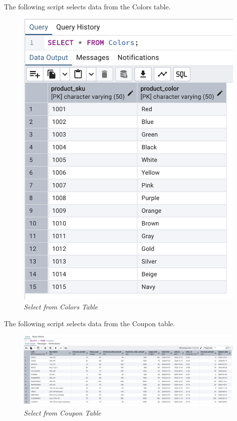 The following script selects data from the Colors table.


\begin{figure}[H]
  \centering
  \includegraphics[width=1\textwidth]{images/sql/select/colors.png}
  \caption{\textit{Select from Colors Table}}
\end{figure}

The following script selects data from the Coupon table.


\begin{figure}[H]
  \centering
  \includegraphics[width=1\textwidth]{images/sql/select/coupon.png}
  \caption{\textit{Select from Coupon Table}}
\end{figure}

